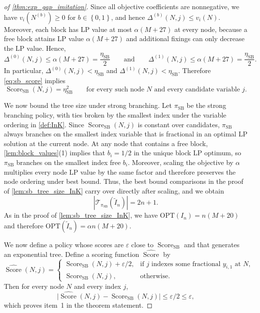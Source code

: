 \documentclass[smallextended,envcountsect]{svjour3} %
\newcommand{\set}[1]{\left\{#1\right\}}
\newcommand{\Tcal}{\mathcal{T}}
\newcommand{\0}{\mathbf{0}}
\DeclareMathOperator{\Score}{Score} %
\newcommand{\1}{\mathbf{1}} %
\begin{document}
\begin{proof}[of \cref{thm:exp_gap_imitation}]
		Since all objective coefficients are nonnegative, we have $v_i(N^{(b)})\ge 0$ for $b\in\set{0,1}$, and hence $\Delta^{(b)}(N,j)\le v_i(N)$.
		Moreover, each block has LP value at most $\alpha(M+27)$ at every node, because a free block attains LP value $\alpha(M+27)$ and additional fixings can only decrease the LP value.
		Hence,
		\[
			\Delta^{(0)}(N,j)\le \alpha(M+27)=\frac{\eta_{\mathrm{SB}}}{2}
		\qquad\text{and}\qquad
		\Delta^{(1)}(N,j)\le \alpha(M+27)=\frac{\eta_{\mathrm{SB}}}{2}.
		\]
		In particular, $\Delta^{(0)}(N,j)<\eta_{\mathrm{SB}}$ and $\Delta^{(1)}(N,j)<\eta_{\mathrm{SB}}$.
		Therefore \eqref{eq:sb_score} implies
				\[
					\Score_{\mathrm{SB}}(N,j)=\eta_{\mathrm{SB}}^2
						\qquad\text{for every such node $N$ and every candidate variable $j$.}
		\]

		We now bound the tree size under strong branching.
		Let $\pi_{\mathrm{SB}}$ be the strong branching policy, with ties broken by the smallest index under the variable ordering in \cref{def:InK}.
		Since $\Score_{\mathrm{SB}}(N,j)$ is constant over candidates, $\pi_{\mathrm{SB}}$ always branches on the smallest index variable that is fractional in an optimal LP solution at the current node.
		At any node that contains a free block, \cref{lem:block_values}(1) implies that $b_i=1/2$ in the unique block LP optimum, so $\pi_{\mathrm{SB}}$ branches on the smallest index free $b_i$.
		Moreover, scaling the objective by $\alpha$ multiplies every node LP value by the same factor and therefore preserves the node ordering under best bound.
		Thus, the best bound comparisons in the proof of \cref{lem:sb_tree_size_InK} carry over directly after scaling, and we obtain
		\[
			|\Tcal_{\pi_{\mathrm{SB}}}(\widetilde I_n)|=2n+1.
	\]
	As in the proof of \cref{lem:sb_tree_size_InK}, we have $\mathrm{OPT}(I_n)=n(M+20)$ and therefore $\mathrm{OPT}(\widetilde I_n)=\alpha n(M+20)$.

	We now define a policy whose scores are $\varepsilon$ close to $\Score_{\mathrm{SB}}$ and that generates an exponential tree.
	Define a scoring function $\widehat{\Score}$ by
	\[
			\widehat{\Score}(N,j)=
			\begin{cases}
				\Score_{\mathrm{SB}}(N,j)+\varepsilon/2, & \text{if $j$ indexes some fractional $y_{i,1}$ at $N$,} \\
				\Score_{\mathrm{SB}}(N,j), & \text{otherwise.}
			\end{cases}
		\]
	Then for every node $N$ and every index $j$,
	\[
		\bigl|\widehat{\Score}(N,j)-\Score_{\mathrm{SB}}(N,j)\bigr|\le \varepsilon/2\le \varepsilon,
	\]
	which proves item~1 in the theorem statement.


\end{proof}
\end{document}
